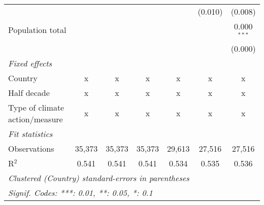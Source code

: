 \begin{tabular}{lcccccc}
                                                                                     &             &               &               &               & (0.010)       & (0.008)\\   
   Population total                                                                  &             &               &               &               &               & 0.000$^{***}$\\   
                                                                                     &             &               &               &               &               & (0.000)\\   
   \emph{Fixed effects}\\
   Country                                                                           & x           & x             & x             & x             & x             & x\\  
   Half decade                                                                       & x           & x             & x             & x             & x             & x\\  
   Type of climate action/measure                                                    & x           & x             & x             & x             & x             & x\\  
   \midrule \emph{Fit statistics}\\
   Observations                                                                      & 35,373      & 35,373        & 35,373        & 29,613        & 27,516        & 27,516\\  
   R$^2$                                                                             & 0.541       & 0.541         & 0.541         & 0.534         & 0.535         & 0.536\\  
   \midrule
   \multicolumn{7}{l}{\emph{Clustered (Country) standard-errors in parentheses}}\\
   \multicolumn{7}{l}{\emph{Signif. Codes: ***: 0.01, **: 0.05, *: 0.1}}\\
\end{tabular}
\par\endgroup


